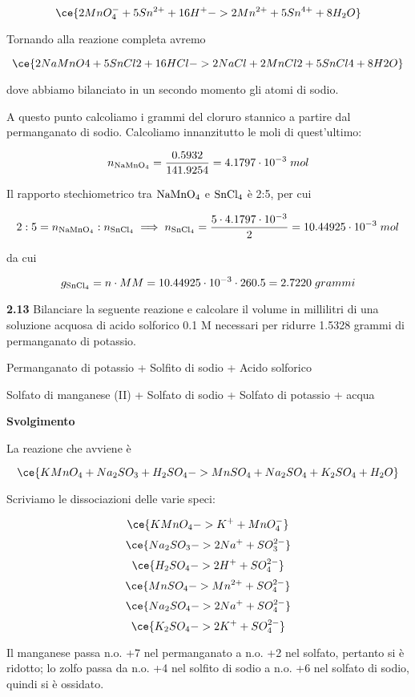 $$\ce{2MnO_4^- + 5Sn^{2+} + 16H^+ -> 2Mn^{2+} + 5Sn^{4+} + 8H_2O}$$

Tornando alla reazione completa avremo

$$\ce{2NaMnO4 + 5SnCl2 + 16HCl -> 2NaCl + 2MnCl2 + 5SnCl4 + 8H2O}$$

dove abbiamo bilanciato in un secondo momento gli atomi di sodio.

A questo punto calcoliamo i grammi del cloruro stannico a partire dal permanganato di sodio. Calcoliamo innanzitutto le moli di quest'ultimo:

$$n_{\rm NaMnO_4}=\frac{0.5932}{141.9254}
=4.1797 \cdot 10^{-3}\;mol$$

Il rapporto stechiometrico tra $\rm NaMnO_4$ e $\rm SnCl_4$ è 2:5, per cui 

$$2:5=n_{\rm NaMnO_4}:n_{\rm SnCl_4}
\implies
n_{\rm SnCl_4}=\frac{5 \cdot 4.1797 \cdot 10^{-3}}{2}
=10.44925 \cdot 10^{-3}\;mol$$

da cui

$$g_{\rm SnCl_4}=n \cdot MM=10.44925 \cdot 10^{-3} \cdot 260.5=2.7220\;grammi$$

\vspace{0.2cm}\textbf{2.13} Bilanciare la seguente reazione e calcolare il volume in millilitri di una soluzione acquosa di acido solforico 0.1 M necessari per ridurre 1.5328 grammi di permanganato di potassio.

\begin{center}
    Permanganato di potassio + Solfito di sodio + Acido solforico \ce{->}

    \ce{->} Solfato di manganese (II) + Solfato di sodio + Solfato di potassio + acqua
\end{center}

\vspace{0.2cm}\large\textbf{Svolgimento}\normalsize

\vspace{0.2cm}La reazione che avviene è

$$\ce{KMnO_4 + Na_2SO_3 + H_2SO_4 -> MnSO_4 + Na_2SO_4 + K_2SO_4 + H_2O}$$

Scriviamo le dissociazioni delle varie speci:

$$\ce{KMnO_4 -> K^+ + MnO_4^-}$$
$$\ce{Na_2SO_3 -> 2Na^+ + SO_3^{2-}}$$
$$\ce{H_2SO_4 -> 2H^+ + SO_4^{2-}}$$
$$\ce{MnSO_4 -> Mn^{2+} + SO_4^{2-}}$$
$$\ce{Na_2SO_4 -> 2Na^+ + SO_4^{2-}}$$
$$\ce{K_2SO_4 -> 2K^+ + SO_4^{2-}}$$

Il manganese passa n.o. +7 nel permanganato a n.o. +2 nel solfato, pertanto si è ridotto; lo zolfo passa da n.o. +4 nel solfito di sodio a n.o. +6 nel solfato di sodio, quindi si è ossidato.

